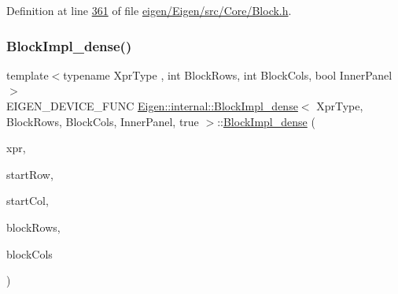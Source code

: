 Definition at line \hyperlink{eigen_2_eigen_2src_2_core_2_block_8h_source_l00361}{361} of file \hyperlink{eigen_2_eigen_2src_2_core_2_block_8h_source}{eigen/\+Eigen/src/\+Core/\+Block.\+h}.

\mbox{\label{class_eigen_1_1internal_1_1_block_impl__dense_3_01_xpr_type_00_01_block_rows_00_01_block_cols_00_01_inner_panel_00_01true_01_4_a9e2d1e641a5000ca0c10b1eaeab84adf}} 
\subsubsection{\texorpdfstring{Block\+Impl\+\_\+dense()}{BlockImpl\_dense()}\hspace{0.1cm}{\footnotesize\ttfamily [3/6]}}
{\footnotesize\ttfamily template$<$typename Xpr\+Type , int Block\+Rows, int Block\+Cols, bool Inner\+Panel$>$ \\
E\+I\+G\+E\+N\+\_\+\+D\+E\+V\+I\+C\+E\+\_\+\+F\+U\+NC \hyperlink{class_eigen_1_1internal_1_1_block_impl__dense}{Eigen\+::internal\+::\+Block\+Impl\+\_\+dense}$<$ Xpr\+Type, Block\+Rows, Block\+Cols, Inner\+Panel, true $>$\+::\hyperlink{class_eigen_1_1internal_1_1_block_impl__dense}{Block\+Impl\+\_\+dense} (\begin{DoxyParamCaption}\item[{Xpr\+Type \&}]{xpr,  }\item[{\hyperlink{namespace_eigen_a62e77e0933482dafde8fe197d9a2cfde}{Index}}]{start\+Row,  }\item[{\hyperlink{namespace_eigen_a62e77e0933482dafde8fe197d9a2cfde}{Index}}]{start\+Col,  }\item[{\hyperlink{namespace_eigen_a62e77e0933482dafde8fe197d9a2cfde}{Index}}]{block\+Rows,  }\item[{\hyperlink{namespace_eigen_a62e77e0933482dafde8fe197d9a2cfde}{Index}}]{block\+Cols }\end{DoxyParamCaption})\hspace{0.3cm}{\ttfamily [inline]}}


